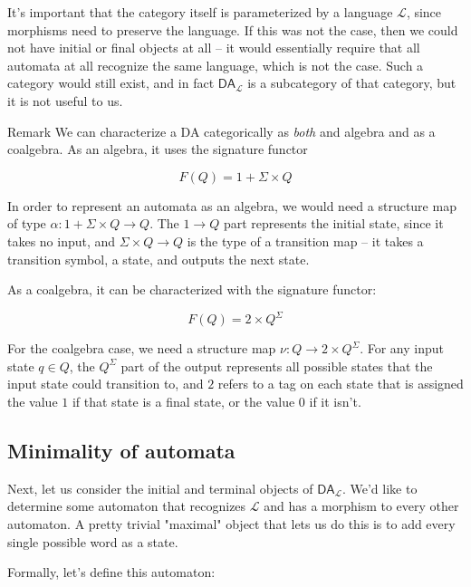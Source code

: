 \documentclass{article}
\theoremstyle{plain}
\theoremstyle{definition}
\begin{document}
It's important that the category itself is parameterized by a language \ensuremath{\mathcal{L}}, since morphisms need to preserve the language. If this was not the case, then we could not have initial or final objects at all -- it would essentially require that all automata at all recognize the same language, which is not the case. Such a category would still exist, and in fact \ensuremath{{\mathsf{DA}}_{\mathcal{L}}} is a subcategory of that category, but it is not useful to us.

 Remark We can characterize a DA categorically as \emph{both} and algebra and as a coalgebra. As an algebra, it uses the signature functor

\[
F\left( Q \right) = 1 + \Sigma \times Q
\]

In order to represent an automata as an algebra, we would need a structure map of type \ensuremath{\alpha : 1 + \Sigma \times Q \rightarrow Q}. The \ensuremath{1 \rightarrow Q} part represents the initial state, since it takes no input, and \ensuremath{\Sigma \times Q \rightarrow Q} is the type of a transition map -- it takes a transition symbol, a state, and outputs the next state.

As a coalgebra, it can be characterized with the signature functor:

\[
F\left( Q \right) = 2 \times {Q}^{\Sigma }
\]

For the coalgebra case, we need a structure map \ensuremath{\nu : Q \rightarrow 2 \times {Q}^{\Sigma }}. For any input state \ensuremath{q \in Q}, the \ensuremath{{Q}^{\Sigma }} part of the output represents all possible states that the input state could transition to, and \ensuremath{2} refers to a tag on each state that is assigned the value \ensuremath{1} if that state is a final state, or the value \ensuremath{0} if it isn't. 

\subsection{Minimality of automata}


Next, let us consider the initial and terminal objects of \ensuremath{{\mathsf{DA}}_{\mathcal{L}}}. We'd like to determine some automaton that recognizes \ensuremath{\mathcal{L}} and has a morphism to every other automaton. A pretty trivial "maximal" object that lets us do this is to add every single possible word as a state.

Formally, let's define this automaton:
\end{document}

